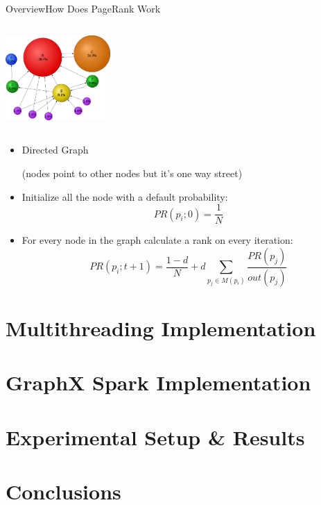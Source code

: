 \documentclass{beamer}
\begin{document}
\begin{frame}{Overview}{How Does PageRank Work}
    \begin{minipage}{4cm}
        \includegraphics[height=4cm, width=4cm]{figure2.png}
    \end{minipage}%
    \begin{minipage}{7cm}
        \begin{itemize}
            \item{Directed Graph}
                
                (nodes point to other nodes but it's one way
                street)
            \item{Initialize all the node with a default probability: 
                $$PR(p_i;0) = \frac{1}{N}$$
                }
            \item{For every node in the graph calculate a rank on every iteration: 
                $$PR(p_i;{t+1}) = \frac{1-d}{N} + d\sum_{p_j\in
                M(p_i)}\frac{PR(p_j)}{out(p_j)}$$ }
        \end{itemize}
    \end{minipage}
\end{frame}

\section{Multithreading Implementation}

\section{GraphX Spark Implementation}

\section{Experimental Setup & Results}

\section{Conclusions}

\begin{frame}


\end{frame}
\end{document}
